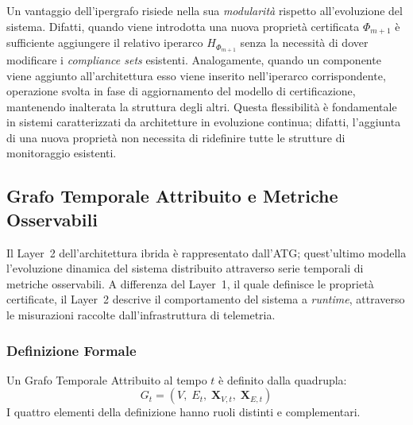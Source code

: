 Un vantaggio dell'ipergrafo risiede nella sua \emph{modularità} rispetto all'evoluzione del
sistema. Difatti, quando viene introdotta una nuova proprietà certificata $\Phi_{m+1}$ è
sufficiente aggiungere il relativo iperarco $H_{\Phi_{m+1}}$ senza la necessità di dover
modificare i \textit{compliance sets} esistenti. Analogamente, quando un componente viene aggiunto
all'architettura esso viene inserito nell'iperarco corrispondente, operazione svolta in fase di
aggiornamento del modello di certificazione, mantenendo inalterata la struttura degli altri.
Questa flessibilità è fondamentale in sistemi caratterizzati da architetture in evoluzione continua;
difatti, l'aggiunta di una nuova proprietà non necessita di ridefinire tutte le strutture di
monitoraggio esistenti.

\subsection{Grafo Temporale Attribuito e Metriche Osservabili}
\label{sec:atg_metriche}

Il Layer~2 dell'architettura ibrida è rappresentato dall'\gls{ATG}; quest'ultimo modella
l'evoluzione dinamica del sistema distribuito attraverso serie temporali di metriche osservabili.
A differenza del Layer~1, il quale definisce le proprietà certificate, il Layer~2 descrive il
comportamento del sistema a \textit{runtime}, attraverso le misurazioni raccolte dall'infrastruttura
di telemetria.

\subsubsection{Definizione Formale}
\label{sec:def_formale_atg}
Un Grafo Temporale Attribuito al tempo $t$ è definito dalla quadrupla:
\begin{equation}
\label{eq:atg_def}
G_t = (V,\; E_t,\; \mathbf{X}_{V,t},\; \mathbf{X}_{E,t})
\end{equation}
I quattro elementi della definizione hanno ruoli distinti e complementari.

